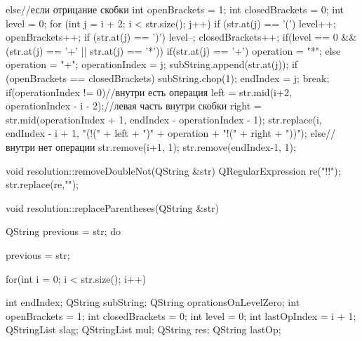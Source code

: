 \documentclass[12pt, a4paper]{article}
\begin{document}
\begin{cppcode}[caption = Файл Resolution.cpp]
{{{{{	  					}
	  					else{//если отрицание скобки
	  						int openBrackets = 1;
	  						int closedBrackets = 0;
	  						int level = 0;
	  						for (int j = i + 2; i < str.size(); j++) {
	  							if (str.at(j) == '('){
	  								level++;
	  								openBrackets++;
	  							}
	  							if (str.at(j) == ')'){
	  								level--;
	  								closedBrackets++;
	  							}
	  							if(level == 0 && (str.at(j) == '+' || str.at(j) == '*')){
	  								if(str.at(j) == '+') operation = "*";
	  								else operation = "+";
	  								operationIndex = j;
	  							}
	  							subString.append(str.at(j));
	  							if (openBrackets == closedBrackets){
	  								subString.chop(1);
	  								endIndex = j;
	  								break;
	  							}
	  						}
	  						if(operationIndex != 0){//внутри есть операция
	  							left = str.mid(i+2, operationIndex - i - 2);//левая часть внутри скобки
	  							right = str.mid(operationIndex + 1, endIndex - operationIndex - 1);
	  							str.replace(i, endIndex - i + 1, "(!(" + left + ")" + operation + "!(" + right + "))");
	  						}
	  						else{//внутри нет операции
	  							str.remove(i+1, 1);
	  							str.remove(endIndex-1, 1);
	  						}
	  					}
	  				}
	  			}
	  		}
	  	}
	  	
	  	void resolution::removeDoubleNot(QString &str)
	  	{
	  		QRegularExpression re("!!");
	  		str.replace(re,"");
	  	}
	  	
	  	void resolution::replaceParentheses(QString &str)
	  	{
	  		QString previous = str;
	  		do{
	  			previous = str;
	  			
	  			for(int i = 0; i < str.size(); i++){
	  				int endIndex;
	  				QString subString;
	  				QString oprationsOnLevelZero;
	  				int openBrackets = 1;
	  				int closedBrackets = 0;
	  				int level = 0;
	  				int lastOpIndex = i + 1;
	  				QStringList slag;
	  				QStringList mul;
	  				QString res;
	  				QString lastOp;
	  				
}}}
\end{cppcode}
\end{document}
